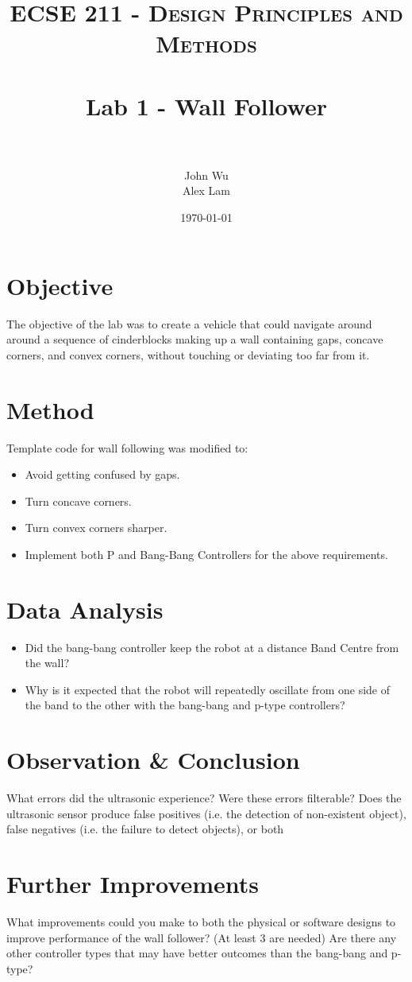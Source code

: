 \documentclass[paper=a4, fontsize=11pt]{scrartcl}
\title{
		\usefont{OT1}{bch}{b}{n}
		\normalfont \normalsize \textsc{ECSE 211 - Design Principles and Methods} \\ [25pt]
		\horrule{0.5pt} \\[0.4cm]
		\huge Lab 1 - Wall Follower \\
		\horrule{2pt} \\[0.5cm]
}
\author{John Wu \\ Alex Lam}
\date{\today}
\begin{document}
 
\maketitle
 
\section{Objective}

The objective of the lab was to create a vehicle that could navigate around around a sequence of cinderblocks making up a wall containing gaps, concave corners, and convex corners, without touching or deviating too far from it.
 
\section{Method}
 
Template code for wall following was modified to:

\begin{itemize}
  \item Avoid getting confused by gaps.
  \item Turn concave corners.
  \item Turn convex corners sharper.
  \item Implement both P and Bang-Bang Controllers for the above requirements.
\end{itemize}
 
\section{Data Analysis}

\begin{itemize}
  \item Did the bang-bang controller keep the robot at a distance Band Centre from the wall?
  \item Why is it expected that the robot will repeatedly oscillate from one side of the band to the other with the bang-bang and p-type controllers?
\end{itemize}

\section{Observation \& Conclusion}
 
What errors did the ultrasonic experience? Were these errors filterable? Does the ultrasonic sensor produce false positives (i.e. the detection of non-existent object), false negatives (i.e. the failure to detect objects), or both

\section{Further Improvements}

What improvements could you make to both the physical or software designs to improve performance of the wall follower? (At least 3 are needed) Are there any other controller types that may have better outcomes than the bang-bang and p-type?
\end{document}
